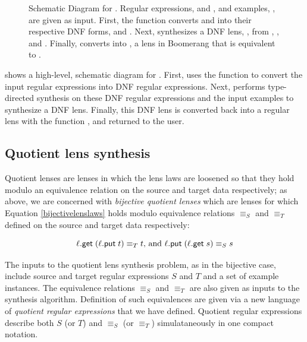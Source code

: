 \documentclass[12pt]{article}
\begin{document}
{\begin{figure}
\begin{tikzpicture}[auto,node distance=1.5cm]

  \end{tikzpicture}
  \caption{Schematic Diagram for \Optician{}.  Regular expressions, \Regex{} and
    \RegexAlt{}, and examples, \Examples{}, are given as input.
    First, the function \ToDNFRegex{} converts \Regex{} and \RegexAlt{} into
    their respective DNF forms, \DNFRegex{} and \DNFRegexAlt{}.
    Next, \SynthDNFLens{} synthesizes a DNF lens, \DNFLens{}, from \Regex{},
    \RegexAlt{}, and \Examples{}.
    Finally, \ToLens{} converts \DNFLens{} into \Lens{}, a lens in Boomerang
    that is equivalent to \DNFLens{}.}
  \label{fig:schematic-diagram-synthesis}
\end{figure}

 shows a high-level,
schematic diagram for \Optician{}.
First, \Optician{} uses the function \ToDNFRegex{} to convert the input
regular expressions into DNF regular expressions.  Next,
\SynthDNFLens{} performs type-directed synthesis on these DNF regular
expressions and the input examples to synthesize a DNF lens.  Finally, this DNF lens is
converted back into a regular lens with the function \ToLens{}, and returned to the user.


\subsection{Quotient lens synthesis}

Quotient lenses are lenses in which the lens laws are
loosened so that they hold modulo an equivalence relation on the source and
target data respectively; as above, we are concerned with {\em bijective
quotient lenses} which are lenses for which Equation \ref{bijectivelenslaws}
holds modulo equivalence relations $\equiv_S$ and $\equiv_T$ defined on the source
and target data respectively:

\begin{equation}\label{quotientlenslaws}
\ell.\get \; (\ell.\lput \; t) \equiv_T t \text{, and } \ell.\lput \; (\ell.\get
\; s) \equiv_S s
\end{equation}

The inputs to the quotient lens synthesis problem, as in the bijective case,
include source and target regular expressions $S$ and $T$ and a set of example
instances.  The equivalence relations $\equiv_S$ and $\equiv_T$ are also given
as inputs to the synthesis algorithm.  Definition of such equivalences
are given via a new language of \textit{quotient regular expressions}
that we have defined.  Quotient regular expressions
describe both  $S$ (or $T$) and $\equiv_S$ (or $\equiv_T$)
simulataneously in one compact notation.

}
\end{document}
